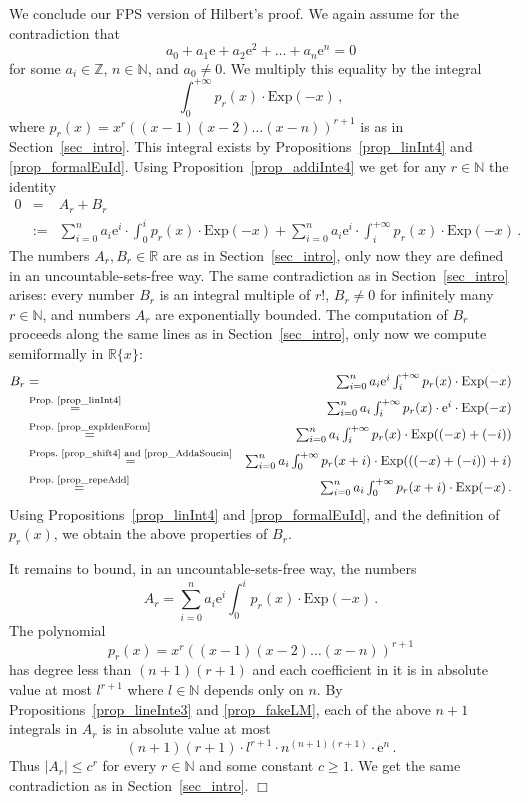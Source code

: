 \documentclass[10pt]{article}
\def\N{\mathbb{N}}
\def\Z{\mathbb{Z}}
\def\R{\mathbb{R}}
\def\eproof{\hfill{$\Box$}\bigskip}
\def\ds{\dots}
\begin{document}
We conclude our FPS version of Hilbert's proof. We again assume for the contradiction that
$$
a_0+a_1\mathrm{e}+a_2\mathrm{e}^2+\ds+a_n\mathrm{e}^n=0
$$
for some $a_i\in\Z$, $n\in\N$, and $a_0\ne0$.  We multiply this equality 
by the integral 
$${\textstyle
\int_0^{+\infty}p_r(x)\cdot
\mathrm{Exp}(-x)\,,
}
$$
where $p_r(x)=x^r((x-1)(x-2)\ds(x-n))^{r+1}$ is as in 
Section~\ref{sec_intro}.  This integral exists by 
Propositions~\ref{prop_linInt4}
and \ref{prop_formalEuId}. Using  
Proposition~\ref{prop_addiInte4} we get for any $r\in\N$ the identity
\begin{eqnarray*}
0&=&A_r+B_r\\
&:=&{\textstyle\sum_{i=0}^n a_i\mathrm{e}^i\cdot\int_0^i p_r(x)\cdot\mathrm{Exp}(-x)+
\sum_{i=0}^n a_i\mathrm{e}^i\cdot\int_i^{+\infty} p_r(x)\cdot\mathrm{Exp}(-x)\,.
}
\end{eqnarray*}
The numbers $A_r,B_r\in\R$ are as in 
Section~\ref{sec_intro}, only now they are defined in an uncountable-sets-free 
way. The same contradiction as in Section~\ref{sec_intro} arises: every number
$B_r$ is an integral multiple of $r!$, $B_r\ne0$ for 
infinitely many $r\in\N$, and numbers $A_r$ are exponentially bounded. The 
computation of $B_r$ proceeds along the same lines as in 
Section~\ref{sec_intro}, only now we compute 
semiformally in $\R\{x\}$: 
\begin{eqnarray*}
B_r&=&{\textstyle
\sum_{i=0}^n a_i\mathrm{e}^i\int_i^{+\infty}p_r(x)
\cdot\mathrm{Exp}(-x)}\\
&\stackrel{\text{Prop.~\ref{prop_linInt4}}}{=}&{\textstyle
\sum_{i=0}^n a_i\int_i^{+\infty}p_r(x)\cdot
\mathrm{e}^i\cdot
\mathrm{Exp}(-x)}\\
&\stackrel{\text{Prop.~\ref{prop_expIdenForm}}}{=}&{\textstyle
\sum_{i=0}^n a_i\int_i^{+\infty}p_r(x)\cdot\mathrm{Exp}((-x)+(-i))}\\
&\stackrel{\text{Props.~\ref{prop_shift4} and \ref{prop_AddaSoucin}}}{=}&
{\textstyle
\sum_{i=0}^n a_i\int_0^{+\infty}p_r(x+i)\cdot\mathrm{Exp}(((-x)+(-i))+i)}\\
&\stackrel{\text{Prop.~\ref{prop_repeAdd}}}{=}&{\textstyle
\sum_{i=0}^n a_i\int_0^{+\infty}p_r(x+i)\cdot
\mathrm{Exp}(-x)}\,.
\end{eqnarray*}
Using Propositions~\ref{prop_linInt4} and \ref{prop_formalEuId}, and the definition of $p_r(x)$, we obtain the above properties of $B_r$.

It remains to bound, in an uncountable-sets-free 
way, the numbers
$${\textstyle
A_r=\sum_{i=0}^n a_i\mathrm{e}^i\int_0^i p_r(x)\cdot\mathrm{Exp}(-x)\,.
}
$$
The polynomial 
$$
p_r(x)=x^r((x-1)(x-2)\ds(x-n))^{r+1}
$$ 
has degree less than $(n+1)(r+1)$ and each coefficient in it is in absolute 
value at most $l^{r+1}$ where $l\in\N$ depends only on $n$.  By 
Propositions~\ref{prop_lineInte3} and \ref{prop_fakeLM}, each of the above  $n+1$ integrals in $A_r$ is in absolute value at most
$$
(n+1)(r+1)\cdot l^{r+1}\cdot n^{(n+1)(r+1)}\cdot\mathrm{e}^n\,.
$$
Thus $|A_r|\le c^r$ for every $r\in\N$ and some constant $c\ge1$. We get the same contradiction as 
in Section~\ref{sec_intro}.
\eproof
\end{document}
